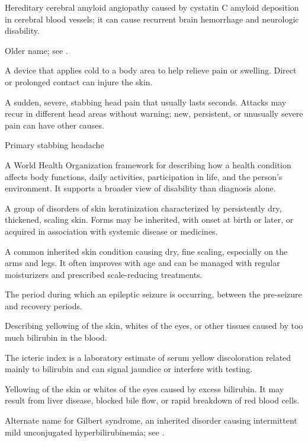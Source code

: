  Hereditary cerebral amyloid angiopathy caused by cystatin C amyloid deposition in cerebral blood vessels; it can cause recurrent brain hemorrhage and neurologic disability.

 Older name; see .

 A device that applies cold to a body area to help relieve pain or swelling. Direct or prolonged contact can injure the skin.

 A sudden, severe, stabbing head pain that usually lasts seconds. Attacks may recur in different head areas without warning; new, persistent, or unusually severe pain can have other causes.

\synonyms
Primary stabbing headache

 A World Health Organization framework for describing how a health condition affects body functions, daily activities, participation in life, and the person’s environment. It supports a broader view of disability than diagnosis alone.

 A group of disorders of skin keratinization characterized by persistently dry, thickened, scaling skin. Forms may be inherited, with onset at birth or later, or acquired in association with systemic disease or medicines.

 A common inherited skin condition causing dry, fine scaling, especially on the arms and legs. It often improves with age and can be managed with regular moisturizers and prescribed scale-reducing treatments.

 The period during which an epileptic seizure is occurring, between the pre-seizure and recovery periods.

 Describing yellowing of the skin, whites of the eyes, or other tissues caused by too much bilirubin in the blood.

 The icteric index is a laboratory estimate of serum yellow discoloration related mainly to bilirubin and can signal jaundice or interfere with testing.

 Yellowing of the skin or whites of the eyes caused by excess bilirubin. It may result from liver disease, blocked bile flow, or rapid breakdown of red blood cells.

 Alternate name for Gilbert syndrome, an inherited disorder causing intermittent mild unconjugated hyperbilirubinemia; see .


